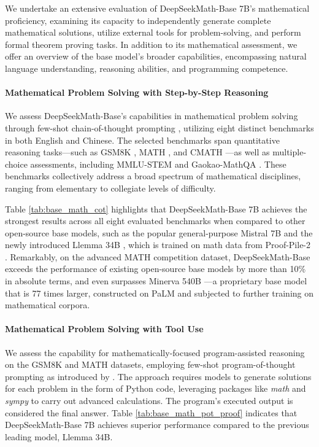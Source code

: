 \begin{itemize}[topsep=0pt]
We undertake an extensive evaluation of DeepSeekMath-Base 7B's mathematical proficiency, examining its capacity to independently generate complete mathematical solutions, utilize external tools for problem-solving, and perform formal theorem proving tasks. In addition to its mathematical assessment, we offer an overview of the base model's broader capabilities, encompassing natural language understanding, reasoning abilities, and programming competence.

\paragraph{Mathematical Problem Solving with Step-by-Step Reasoning}

We assess DeepSeekMath-Base's capabilities in mathematical problem solving through few-shot chain-of-thought prompting \citep{cot}, utilizing eight distinct benchmarks in both English and Chinese. The selected benchmarks span quantitative reasoning tasks—such as GSM8K \citep{gsm8k}, MATH \citep{MATH}, and CMATH \citep{wei2023cmath}—as well as multiple-choice assessments, including MMLU-STEM \citep{mmlu} and Gaokao-MathQA \citep{agieval}. These benchmarks collectively address a broad spectrum of mathematical disciplines, ranging from elementary to collegiate levels of difficulty.

Table \ref{tab:base_math_cot} highlights that DeepSeekMath-Base 7B achieves the strongest results across all eight evaluated benchmarks when compared to other open-source base models, such as the popular general-purpose Mistral 7B \citep{mistral} and the newly introduced Llemma 34B \citep{llemma}, which is trained on math data from Proof-Pile-2 \citep{llemma}. Remarkably, on the advanced MATH competition dataset, DeepSeekMath-Base exceeds the performance of existing open-source base models by more than 10\% in absolute terms, and even surpasses Minerva 540B \citep{minerva}—a proprietary base model that is 77 times larger, constructed on PaLM \citep{palm} and subjected to further training on mathematical corpora.

\paragraph{Mathematical Problem Solving with Tool Use} We assess the capability for mathematically-focused program-assisted reasoning on the GSM8K and MATH datasets, employing few-shot program-of-thought prompting as introduced by \citet{pot,pal}. The approach requires models to generate solutions for each problem in the form of Python code, leveraging packages like \textit{math} and \textit{sympy} to carry out advanced calculations. The program's executed output is considered the final answer. Table \ref{tab:base_math_pot_proof} indicates that DeepSeekMath-Base 7B achieves superior performance compared to the previous leading model, Llemma 34B.


\end{itemize}
